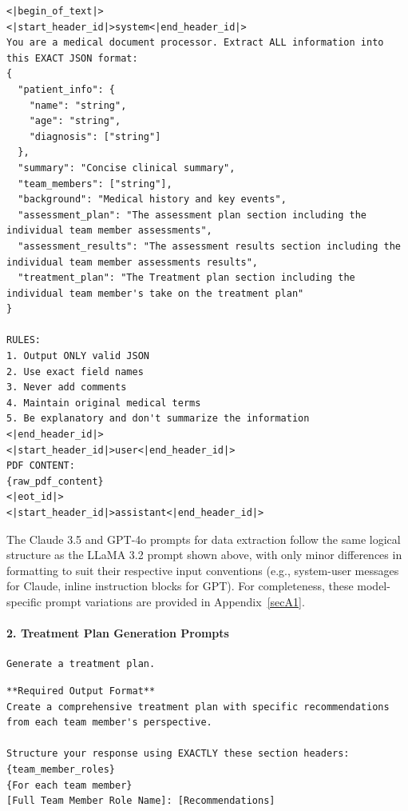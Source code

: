 \documentclass[pdflatex,sn-mathphys-num]{sn-jnl}%
\theoremstyle{thmstyleone}%
\theoremstyle{thmstyletwo}%
\theoremstyle{thmstylethree}%
\begin{document}
\begin{tcolorbox}[mypromptbox, title={LLaMA 3.2 Prompt to extract structured JSON from case study PDF}]
\begin{lstlisting}
<|begin_of_text|>
<|start_header_id|>system<|end_header_id|>
You are a medical document processor. Extract ALL information into this EXACT JSON format:
{
  "patient_info": {
    "name": "string", 
    "age": "string",
    "diagnosis": ["string"]
  },
  "summary": "Concise clinical summary",
  "team_members": ["string"],
  "background": "Medical history and key events",
  "assessment_plan": "The assessment plan section including the individual team member assessments",
  "assessment_results": "The assessment results section including the individual team member assessments results",
  "treatment_plan": "The Treatment plan section including the individual team member's take on the treatment plan"
}

RULES:
1. Output ONLY valid JSON
2. Use exact field names
3. Never add comments
4. Maintain original medical terms
5. Be explanatory and don't summarize the information
<|end_header_id|>
<|start_header_id|>user<|end_header_id|>
PDF CONTENT:
{raw_pdf_content}
<|eot_id|>
<|start_header_id|>assistant<|end_header_id|>
\end{lstlisting}
\end{tcolorbox}

\noindent
The Claude 3.5 and GPT-4o prompts for data extraction follow the same logical structure as the LLaMA 3.2 prompt shown above, with only minor differences in formatting to suit their respective input conventions (e.g., system-user messages for Claude, inline instruction blocks for GPT). For completeness, these model-specific prompt variations are provided in Appendix~\ref{secA1}.

\paragraph{2. Treatment Plan Generation Prompts}

\begin{tcolorbox}[mypromptbox, title={Base Prompt}] 
\begin{lstlisting}
Generate a treatment plan.
\end{lstlisting} 
\end{tcolorbox}

\begin{tcolorbox}[mypromptbox, title={Prompt-Tuned LLM Prompt}]
\begin{lstlisting}
**Required Output Format**
Create a comprehensive treatment plan with specific recommendations from each team member's perspective.

Structure your response using EXACTLY these section headers:
{team_member_roles}
{For each team member}
[Full Team Member Role Name]: [Recommendations]
\end{lstlisting}
\end{tcolorbox}
\end{document}
